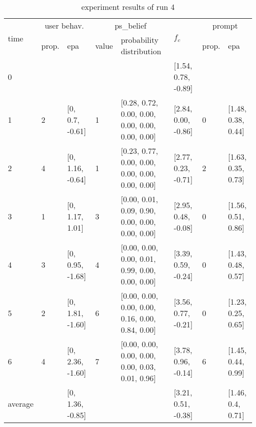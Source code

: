 \begin{table}[htbp]\footnotesize
\caption{experiment results of run 4}
\begin{tabular}{|p{0.4cm}|p{0.6cm}|l|p{0.6cm}|p{3.3cm}|l|p{0.6cm}|l|}
\hline

\multirow{2}{*}{time} & \multicolumn{2}{c|}{user behav.} & \multicolumn{2}{c|}{ps\_belief} &
\multirow{2}{*}{$f_c$} & \multicolumn{2}{c|}{prompt} \\ \cline{2-5}\cline{ 7- 8}
& prop. & epa & value & probability distribution &  & prop. & epa \\ \hline

0 & \multicolumn{1}{l|}{} &  & \multicolumn{1}{l|}{} &  & [1.54, 0.78, -0.89] & \multicolumn{1}{l|}{} &  \\ \hline
1 & 2 & [0, 0.7, -0.61] & 1 & [0.28, 0.72, 0.00, 0.00, 0.00, 0.00, 0.00, 0.00] & [2.84, 0.00, -0.86] & 0 & [1.48, 0.38, 0.44] \\ \hline
2 & 4 & [0, 1.16, -0.64] & 1 & [0.23, 0.77, 0.00, 0.00, 0.00, 0.00, 0.00, 0.00] & [2.77, 0.23, -0.71] & 2 & [1.63, 0.35, 0.73] \\ \hline
3 & 1 & [0, 1.17, 1.01] & 3 & [0.00, 0.01, 0.09, 0.90, 0.00, 0.00, 0.00, 0.00] & [2.95, 0.48, -0.08] & 0 & [1.56, 0.51, 0.86] \\ \hline
4 & 3 & [0, 0.95, -1.68] & 4 & [0.00, 0.00, 0.00, 0.01, 0.99, 0.00, 0.00, 0.00] & [3.39, 0.59, -0.24] & 0 & [1.43, 0.48, 0.57] \\ \hline
5 & 2 & [0, 1.81, -1.60] & 6 & [0.00, 0.00, 0.00, 0.00, 0.16, 0.00, 0.84, 0.00] & [3.56, 0.77, -0.21] & 0 & [1.23, 0.25, 0.65] \\ \hline
6 & 4 & [0, 2.36, -1.60] & 7 & [0.00, 0.00, 0.00, 0.00, 0.00, 0.03, 0.01, 0.96] & [3.78, 0.96, -0.14] & 6 & [1.45, 0.44, 0.99] \\ \hline
\multicolumn{1}{|l|}{average} & \multicolumn{1}{l|}{} & [0, 1.36, -0.85] & \multicolumn{1}{l|}{} &  & [3.21, 0.51, -0.38] & \multicolumn{1}{l|}{} & [1.46, 0.4, 0.71] \\ \hline
\end{tabular}
\label{}
\end{table}


